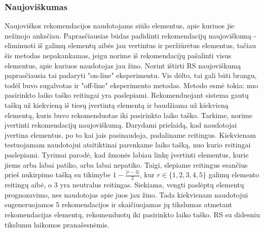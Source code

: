 \documentclass{VUMIFInfMagistrinis}
\begin{document}
\subsubsection{Naujoviškumas}
Naujoviškos rekomendacijos naudotojams siūlo elementus, apie kuriuos jie nežinojo anksčiau. Paprasčiausias būdas padidinti rekomendacijų naujoviškumą - eliminuoti iš galimų elementų aibės jau vertintus ir peržiūrėtus elementus, tačiau šis metodas nepakankamas, jeigu norime iš rekomendacijų pašalinti visus elementus, apie kuriuos naudotojas jau žino.
\newline
\indent
Norint ištirti RS naujoviškumą paprasčiausia tai padaryti "on-line" eksperimentu. Vis dėlto, tai gali būti brangu, todėl buvo sugalvotas ir "off-line" eksperimento metodas. Metodo esmė tokia: nuo pasirinkto laiko taško reitingai yra paslepiami. Rekomenduojant sistema gautų taškų už kiekvieną iš tiesų įvertintą elementą ir baudžiama už kiekvieną elementą, kuris buvo rekomenduotas iki pasirinkto laiko taško.
\newline
\indent
Tarkime, norime įvertinti rekomendacijų naujoviškumą. Darydami prielaidą, kad naudotojai įvertina elementus, po to kai jais pasinaudoja, padaliname reitingus. Kiekvienam testuojamam naudotojui atsitiktinai parenkame laiko tašką, nuo kurio reitingai paslepiami. Tyrimai parodė, kad žmonės labiau linkę įvertinti elementus, kurie jiems arba labai patiko, arba labai nepatiko. Taigi, slepiame reitingus esančius prieš nukirpimo tašką su tikimybe $1-\frac{|r-3|}{2}$, kur $r \in \{1,2,3,4,5\}$ galimų elemento reitingų aibė, o $3$ yra neutralus reitingas. Siekiama, vengti paslėptų elementų prognozavimo, nes naudotojas apie juos jau žino. Tada kiekvienam naudotojui sugeneruojamos $5$ rekomendacijos ir skaičiuojamas jų tikslumas atmetant rekomendacijas elementų, rekomenduotų iki pasirinkto laiko taško. RS su didesniu tikslumu laikomos pranašesnėmis.
\end{document}

